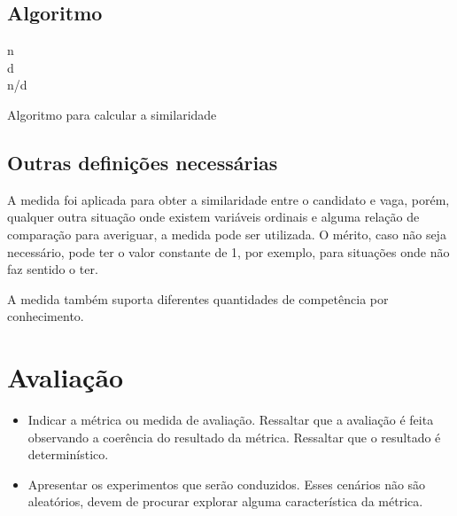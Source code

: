 \documentclass[preprint,12pt]{elsarticle}
\begin{document}
\subsection{Algoritmo}

\begin{algorithm}[H]

    
    n  \\
    d  \\
    \Return n/d
    \caption{Algoritmo para calcular a similaridade}
\end{algorithm}

\subsection{Outras definições necessárias}

A medida foi aplicada para obter a similaridade entre o candidato e vaga, porém, qualquer outra situação onde existem variáveis ordinais e alguma relação de comparação para averiguar, a medida pode ser utilizada. O mérito, caso não seja necessário, pode ter o valor constante de 1, por exemplo, para situações onde não faz sentido o ter.

A medida também suporta diferentes quantidades de competência por conhecimento.

\section{Avaliação}
\label{sec:sample4}
\begin{itemize}
\color{blue}
\item Indicar a métrica ou medida de avaliação. Ressaltar que a avaliação é feita observando a coerência do resultado da métrica. Ressaltar que o resultado é determinístico. 
\item Apresentar os experimentos que serão conduzidos. Esses cenários não são aleatórios, devem de procurar explorar alguma característica da métrica.
\end{itemize}
\end{document}
